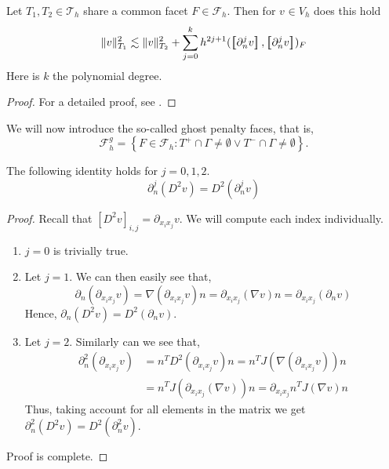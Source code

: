 \begin{lemma}
    \label{lemma:bi_local_facet_estimate}
    Let $T_{1}, T_{2} \in  \mathcal{T} _{h} $ share a common facet $F \in \mathcal{F}_{h} $. Then for $v_{} \in  V_{h}$  does this hold \[
    \| v \|_{ T_{1} }^{  2}  \lesssim  \| v \|_{ T_{2} }^{2  }  + \sum_{j=0}^{k}  h^{2j +1} ( \jump{ \partial _{n}^{j} v}, \jump{ \partial _{n}^{j} v}    )_{F}
    \]
        Here is $k$ the polynomial degree.
\end{lemma}

\begin{proof}
    For a detailed proof, see \cite{gurkan2019stabilized}.
\end{proof}

We will now introduce the so-called ghost penalty faces, that is, \[
\mathcal{F} ^{g}_{h} = \left\{ F\in \mathcal{F} _{h} : T^{+}\cap \Gamma \neq \emptyset  \vee T^{-}\cap \Gamma \neq \emptyset  \right\}.
\]

\begin{proposition}
    \label{prop:hessian_change}
    The following identity holds for $j=0,1,2$.
    $$\partial ^{j}_{n} (D^2v) = D^2 ( \partial ^{j}_{n} v)  $$
\end{proposition}

\begin{proof}
        Recall that $\left[ D^2 v \right]_{i,j} = \partial _{x_{i}x_{j}} v $. We will compute each index individually.
    \begin{enumerate}[label=\arabic*)]
        \item $j = 0$ is trivially true.
        \item Let $j=1$. We can then easily see that, \[
        \partial ^{}_{n} ( \partial _{x_{i} x_{j}} v)  = \nabla  ( \partial _{x_{i} x_{j}} v)   n = \partial _{x_{i} x_{j}} (\nabla  v) n =\partial _{x_{i} x_{j}} (\partial _{n} v)
        \]
        Hence, $\partial _{n} (D^2v) = D^2( \partial _{n}v)$.
        \item Let $j=2$. Similarly can we see that, \[
                \begin{split}
                \partial^{2} _{n} (\partial _{x_{i} x_{j}} v) & = n^{T}  D^2(\partial _{x_{i} x_{j}} v) n = n^{T}  J( \nabla (\partial _{x_{i} x_{j}}v) ) n \\
                & =  n^{T}  J(\partial _{x_{i} x_{j}}(\nabla v) ) n = \partial _{x_{i} x_{j}} n^{T} J(\nabla v) n
                \end{split}
            \]
            Thus, taking account for all elements in the matrix we get $\partial^{2} _{n} (D^2v) = D^2( \partial^{2} _{n}v)$.
    \end{enumerate}
    Proof is complete.

\end{proof}

